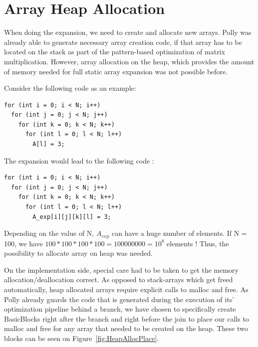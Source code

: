 \chapter{Array Heap Allocation}\label{ch:HeapAlloc}

When doing the expansion, we need to create and allocate new arrays. Polly was already able to generate necessary array creation code, if that array has to be located on the stack as part of the pattern-based optimization of matrix multiplication. However, array allocation on the heap, which provides the amount of memory needed for full static array expansion was not possible before.

Consider the following code as an example:
\begin{lstlisting}[frame=single]
for (int i = 0; i < N; i++)
  for (int j = 0; j < N; j++)
    for (int k = 0; k < N; k++)
      for (int l = 0; l < N; l++)
        A[l] = 3;
\end{lstlisting}

The expansion would lead to the following code :
\begin{lstlisting}[frame=single]
for (int i = 0; i < N; i++)
  for (int j = 0; j < N; j++)
    for (int k = 0; k < N; k++)
      for (int l = 0; l < N; l++)
        A_exp[i][j][k][l] = 3;
\end{lstlisting}

Depending on the value of N, $A_{exp}$ can have a huge number of elements. If N = 100, we have $100*100*100*100 = 100000000 = 10^8$ elements ! Thus, the possibility to allocate array on heap was needed.

On the implementation side, special care had to be taken to get the memory allocation/deallocation correct. As opposed to stack-arrays which get freed automatically, heap allocated arrays require explicit calls to malloc and free. As Polly already guards the code that is generated during the execution of its’ optimization pipeline behind a branch, we have chosen to specifically create BasicBlocks right after the branch and right before the join to place our calls to malloc and free for any array that needed to be created on the heap. These two blocks can be seen on Figure~\ref{fig:HeapAllocPlace}.

